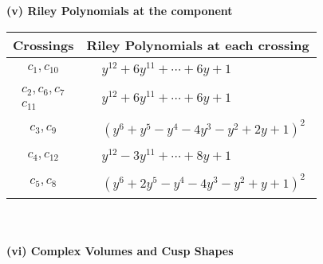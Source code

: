 \documentclass[1p]{elsarticle_modified}
\theoremstyle{definition}
\begin{document}
\newpage\renewcommand{\arraystretch}{1}
\flushleft \textbf{(v) Riley Polynomials at the component}\newline \\
\begin{tabular}{m{50pt}|m{274pt}}
Crossings & \hspace{64pt}Riley Polynomials at each crossing \\
\hline $$\begin{aligned}c_{1},c_{10}\end{aligned}$$&$\begin{aligned}
&y^{12}+6 y^{11}+\cdots+6 y+1
\end{aligned}$\\
\hline $$\begin{aligned}c_{2},c_{6},c_{7}\\c_{11}\end{aligned}$$&$\begin{aligned}
&y^{12}+6 y^{11}+\cdots+6 y+1
\end{aligned}$\\
\hline $$\begin{aligned}c_{3},c_{9}\end{aligned}$$&$\begin{aligned}
&(y^6+y^5- y^4-4 y^3- y^2+2 y+1)^2
\end{aligned}$\\
\hline $$\begin{aligned}c_{4},c_{12}\end{aligned}$$&$\begin{aligned}
&y^{12}-3 y^{11}+\cdots+8 y+1
\end{aligned}$\\
\hline $$\begin{aligned}c_{5},c_{8}\end{aligned}$$&$\begin{aligned}
&(y^6+2 y^5- y^4-4 y^3- y^2+y+1)^2
\end{aligned}$\\
\hline
\end{tabular}\\~\\
\newpage\flushleft \textbf{(vi) Complex Volumes and Cusp Shapes}
\end{document}
